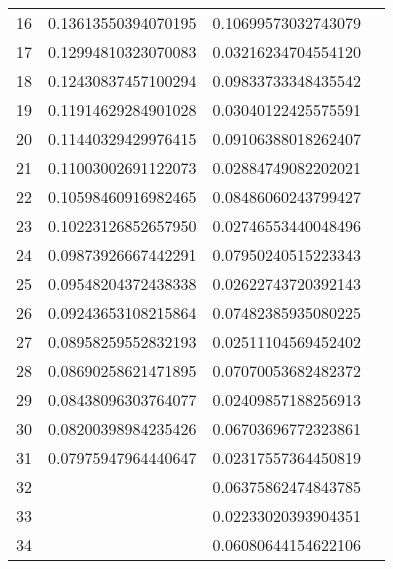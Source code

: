 \begin{table}[]
\begin{center}
\begin{tabular}{|c|c|c|c|}
16 & 0.13613550394070195 & 0.10699573032743079 &                      \\
17 & 0.12994810323070083 & 0.03216234704554120 &                      \\
18 & 0.12430837457100294 & 0.09833733348435542 &                      \\
19 & 0.11914629284901028 & 0.03040122425575591 &                      \\
20 & 0.11440329429976415 & 0.09106388018262407 &                      \\
21 & 0.11003002691122073 & 0.02884749082202021 &                      \\
22 & 0.10598460916982465 & 0.08486060243799427 &                      \\
23 & 0.10223126852657950 & 0.02746553440048496 &                      \\
24 & 0.09873926667442291 & 0.07950240515223343 &                      \\
25 & 0.09548204372438338 & 0.02622743720392143 &                      \\
26 & 0.09243653108215864 & 0.07482385935080225 &                      \\
27 & 0.08958259552832193 & 0.02511104569452402 &                      \\
28 & 0.08690258621471895 & 0.07070053682482372 &                      \\
29 & 0.08438096303764077 & 0.02409857188256913 &                      \\
30 & 0.08200398984235426 & 0.06703696772323861 &                      \\
31 & 0.07975947964440647 & 0.02317557364450819 &                      \\
32 &                     & 0.06375862474843785 &                      \\
33 &                     & 0.02233020393904351 &                      \\
34 &                     & 0.06080644154622106 &                      \\
\hline
\end{tabular}
\end{center}
\label{table:table_2_3}
\end{table}

